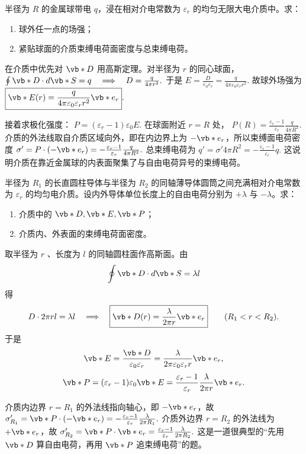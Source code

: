 \documentclass[lang=cn,11pt]{elegantbook}
\begin{document}
\begin{exercise}[浸在均匀电介质中的带电金属球]
半径为 \(R\) 的金属球带电 \(q\)，浸在相对介电常数为 \(\varepsilon_r\) 的均匀无限大电介质中。求：
\begin{enumerate}
 \item 球外任一点的场强；
 \item 紧贴球面的介质束缚电荷面密度与总束缚电荷。
\end{enumerate}
\end{exercise}

\begin{solution}
在介质中优先对 \(\vb*{D}\) 用高斯定理。对半径为 \(r\) 的同心球面，
 \(\oint \vb*{D}\cdot d\vb*{S}=q \quad\Longrightarrow\quad D=\frac{q}{4\pi r^2}.\) 
于是
 \(E=\frac{D}{\varepsilon_0\varepsilon_r} =\frac{q}{4\pi\varepsilon_0\varepsilon_r r^2}.\) 
故球外场强为
 \(\boxed{ \vb*{E}(r)=\frac{q}{4\pi\varepsilon_0\varepsilon_r r^2}\vb*{e}_r }.\) 

接着求极化强度：
 \(P=(\varepsilon_r-1)\varepsilon_0E.\) 
在球面附近 \(r=R\) 处，
 \(P(R)=\frac{\varepsilon_r-1}{\varepsilon_r}\frac{q}{4\pi R^2}.\) 
介质的外法线取自介质区域向外，即在内边界上为 \(-\vb*{e}_r\)，所以束缚面电荷密度
 \(\sigma'=P\cdot(-\vb*{e}_r) =-\frac{\varepsilon_r-1}{\varepsilon_r}\frac{q}{4\pi R^2}.\) 
总束缚电荷为
 \(q'=\sigma'4\pi R^2 =-\frac{\varepsilon_r-1}{\varepsilon_r}q.\) 
这说明介质在靠近金属球的内表面聚集了与自由电荷异号的束缚电荷。
\end{solution}

\begin{exercise}
半径为 \(R_1\) 的长直圆柱导体与半径为 \(R_2\) 的同轴薄导体圆筒之间充满相对介电常数为 \(\varepsilon_r\) 的均匀电介质。设内外导体单位长度上的自由电荷分别为 \(+\lambda\) 与 \(-\lambda\)。求：
\begin{enumerate}
 \item 介质中的 \(\vb*{D},\vb*{E},\vb*{P}\)；
 \item 介质内、外表面的束缚电荷面密度。
\end{enumerate}
\end{exercise}

\begin{solution}
取半径为 \(r\) 、长度为 \(l\) 的同轴圆柱面作高斯面。由
\[
\oint \vb*{D}\cdot d\vb*{S}=\lambda l
\]
得
\[
D\cdot 2\pi rl=\lambda l
\quad\Longrightarrow\quad
\boxed{
\vb*{D}(r)=\frac{\lambda}{2\pi r}\vb*{e}_r
}\qquad (R_1<r<R_2).
\]
于是
\[
\vb*{E}=\frac{\vb*{D}}{\varepsilon_0\varepsilon_r}
=\frac{\lambda}{2\pi\varepsilon_0\varepsilon_r r}\vb*{e}_r,
\]
\[
\vb*{P}=(\varepsilon_r-1)\varepsilon_0\vb*{E}
=\frac{\varepsilon_r-1}{\varepsilon_r}\frac{\lambda}{2\pi r}\vb*{e}_r.
\]

介质内边界 \(r=R_1\) 的外法线指向轴心，即 \(-\vb*{e}_r\)，故
 \(\sigma'_{R_1}=\vb*{P}\cdot(-\vb*{e}_r) =-\frac{\varepsilon_r-1}{\varepsilon_r}\frac{\lambda}{2\pi R_1}.\) 
介质外边界 \(r=R_2\) 的外法线为 \(+\vb*{e}_r\)，故
 \(\sigma'_{R_2}=\vb*{P}\cdot\vb*{e}_r =\frac{\varepsilon_r-1}{\varepsilon_r}\frac{\lambda}{2\pi R_2}.\) 
这是一道很典型的“先用 \(\vb*{D}\) 算自由电荷，再用 \(\vb*{P}\) 追束缚电荷”的题。
\end{solution}
\end{document}
